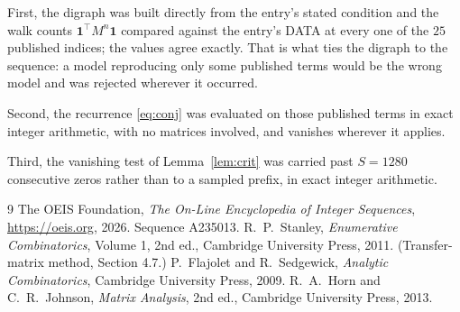 \documentclass[11pt,a4paper]{article}
\theoremstyle{plain}
\theoremstyle{definition}
\begin{document}
First, the digraph was built directly from the entry's stated condition and the walk counts
$\mathbf{1}^{\!\top}M^{n}\mathbf{1}$ compared against the entry's DATA at every one of
the $25$ published indices; the values agree exactly. That is what ties the digraph to
the sequence: a model reproducing only some published terms would be the wrong model and
was rejected wherever it occurred.

Second, the recurrence \eqref{eq:conj} was evaluated on those published terms in exact
integer arithmetic, with no matrices involved, and vanishes wherever it applies.

Third, the vanishing test of Lemma~\ref{lem:crit} was carried past $S=1280$ consecutive
zeros rather than to a sampled prefix, in exact integer arithmetic.

\begin{thebibliography}{9}
 The OEIS Foundation, \emph{The On-Line Encyclopedia of Integer
Sequences}, \url{https://oeis.org}, 2026. Sequence A235013.
 R.~P.~Stanley, \emph{Enumerative Combinatorics}, Volume 1, 2nd ed.,
Cambridge University Press, 2011. (Transfer-matrix method, Section 4.7.)
 P.~Flajolet and R.~Sedgewick, \emph{Analytic Combinatorics}, Cambridge
University Press, 2009.
 R.~A.~Horn and C.~R.~Johnson, \emph{Matrix Analysis}, 2nd ed., Cambridge
University Press, 2013.
\end{thebibliography}
\end{document}
